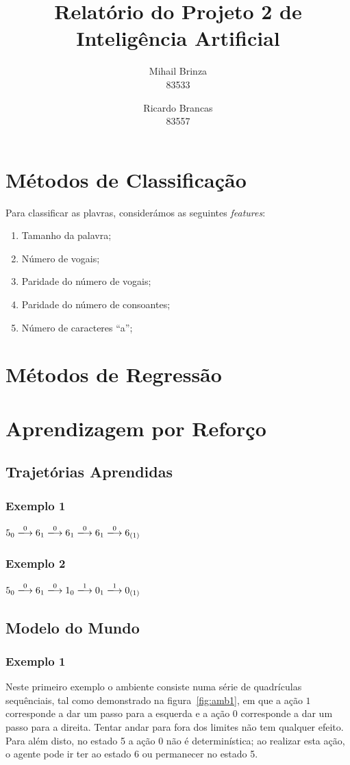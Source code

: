 \documentclass[a4paper,twocolumn]{article}
\title{\LARGE \textbf{Relatório do Projeto 2 de Inteligência Artificial}}
\author{Mihail Brinza \\ \scriptsize 83533 \normalsize \and Ricardo Brancas \\ \scriptsize 83557 \normalsize}
\begin{document}
    \maketitle

    \section{Métodos de Classificação}
    Para classificar as plavras, considerámos as seguintes \textit{features}:
    \begin{enumerate}
        \item Tamanho da palavra;
        \item Número de vogais;
        \item Paridade do número de vogais;
        \item Paridade do número de consoantes;
        \item Número de caracteres ``a'';
    \end{enumerate}

    \section{Métodos de Regressão}

    \section{Aprendizagem por Reforço}
    \subsection{Trajetórias Aprendidas}
    \subsubsection{Exemplo 1}
    $ 5_0 \xlongrightarrow{0} 6_1 \xlongrightarrow{0} 6_1 \xlongrightarrow{0} 6_1 \xlongrightarrow{0} 6_{(1)} $

    \subsubsection{Exemplo 2}
    $ 5_0 \xlongrightarrow{0} 6_1 \xlongrightarrow{0} 1_0 \xlongrightarrow{1} 0_1 \xlongrightarrow{1} 0_{(1)} $


    \subsection{Modelo do Mundo}
    \subsubsection{Exemplo 1}
    Neste primeiro exemplo o ambiente consiste numa série de quadrículas sequênciais, tal como demonstrado na
    figura~\ref{fig:amb1}, em que a ação $1$ corresponde a dar um passo para a esquerda e a ação $0$ corresponde a
    dar um passo para a direita. Tentar andar para fora dos limites não tem qualquer efeito.
    Para além disto, no estado 5 a ação 0 não é determinística; ao realizar esta ação, o agente pode ir ter ao estado
    6 ou permanecer no estado 5.
\end{document}
